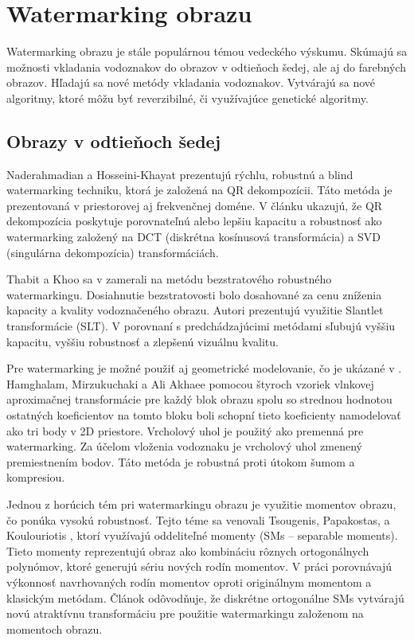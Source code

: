 \section{Watermarking obrazu}
Watermarking obrazu je stále populárnou témou vedeckého výskumu. Skúmajú sa možnosti vkladania vodoznakov do obrazov v odtieňoch šedej, ale aj do farebných obrazov. Hľadajú sa nové metódy vkladania vodoznakov. Vytvárajú sa nové algoritmy, ktoré môžu byť reverzibilné, či využívajúce genetické algoritmy.

\subsection{Obrazy v odtieňoch šedej}
Naderahmadian a Hosseini-Khayat \cite{QRdecomposition} prezentujú rýchlu, robustnú a blind watermarking techniku, ktorá je založená na QR dekompozícii. Táto metóda je prezentovaná v priestorovej aj frekvenčnej doméne. V článku ukazujú, že QR dekompozícia poskytuje porovnateľnú alebo lepšiu kapacitu a robustnosť ako watermarking založený na DCT (diskrétna kosínusová transformácia) a SVD (singulárna dekompozícia) transformáciách.

Thabit a Khoo sa v \cite{Thabit2014-11-01} zamerali na metódu bezstratového robustného watermarkingu. Dosiahnutie bezstratovosti bolo dosahované za cenu zníženia kapacity a kvality vodoznačeného obrazu. Autori prezentujú využitie Slantlet transformácie (SLT). V porovnaní s predchádzajúcimi metódami sľubujú vyššiu kapacitu, vyššiu robustnosť a zlepšenú vizuálnu kvalitu.

Pre watermarking je možné použiť aj geometrické modelovanie, čo je ukázané v \cite{Hamghalam2015}. Hamghalam, Mirzukuchaki a Ali Akhaee pomocou štyroch vzoriek vlnkovej aproximačnej transformácie pre každý blok obrazu spolu so strednou hodnotou ostatných koeficientov na tomto bloku boli schopní tieto koeficienty namodelovať ako tri body v 2D priestore. Vrcholový uhol je použitý ako premenná pre watermarking. Za účelom vloženia vodoznaku je vrcholový uhol zmenený premiestnením bodov. Táto metóda je robustná proti útokom šumom a kompresiou.

Jednou z horúcich tém pri watermarkingu obrazu je využitie momentov obrazu, čo ponúka vysokú robustnosť. Tejto téme sa venovali Tsougenis, Papakostas, a Koulouriotis \cite{Tsougenis2015}, ktorí využívajú oddeliteľné momenty (SMs – separable moments). Tieto momenty reprezentujú obraz ako kombináciu rôznych ortogonálnych polynómov, ktoré generujú sériu nových rodín momentov. V práci porovnávajú výkonnosť navrhovaných rodín momentov oproti originálnym momentom a klasickým metódam. Článok odôvodňuje, že diskrétne ortogonálne SMs vytvárajú novú atraktívnu transformáciu pre použitie watermarkingu založenom na momentoch obrazu.

